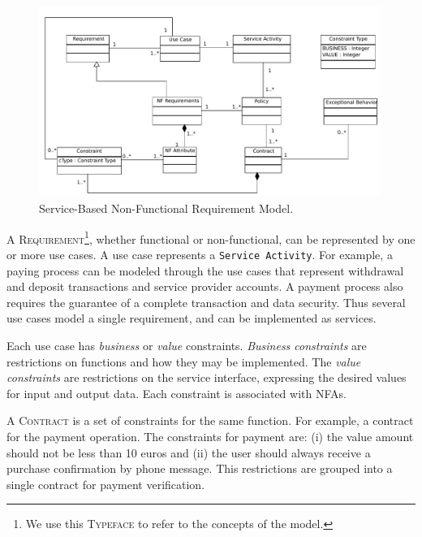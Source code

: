 \begin{figure}  
\centering  
\includegraphics[width=0.99\textwidth]{chapters/state_ofthe_art/figs/contractModel.pdf}
\caption{Service-Based Non-Functional Requirement Model.}
\label{fig:NRFmodel} 
\end{figure}


A \textsc{Requirement}\footnote{We use this \textsc{Typeface} to refer to the
concepts of the model.}, whether functional or non-functional, can be
represented by one or more use cases. A use case represents a \texttt{Service Activity}. For example, a paying process can be modeled through the use cases
that represent withdrawal and deposit transactions and service provider
accounts. A payment process also requires the guarantee of a complete
transaction and data security. Thus several use cases model a single
requirement, and can be implemented as services.
% 
 
Each use case has \textit{business} or
\textit{value} constraints. \textit{Business constraints} are restrictions on
functions and how they may be implemented. The \textit{value constraints} are restrictions on
the service interface, expressing the desired values for input and output data.
Each constraint is associated with NFAs.

A \textsc{Contract} is a set of constraints for the same function. For example,
a contract for the payment operation. The constraints for payment are: (i) the
value amount should not be less than 10 euros and (ii) the user should always
receive a purchase confirmation by phone message. This restrictions are
grouped into a single contract for payment verification. 

